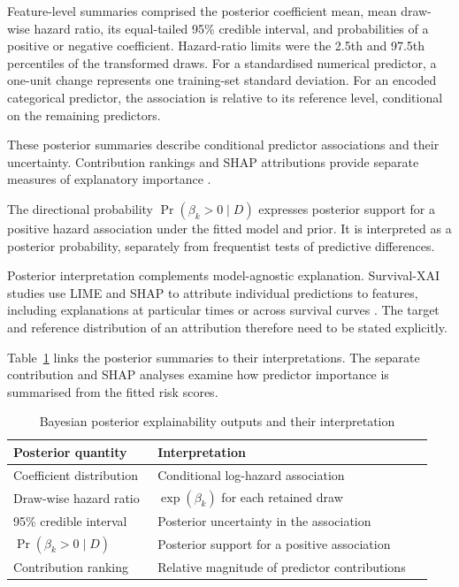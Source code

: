 Feature-level summaries comprised the posterior coefficient mean, mean draw-wise hazard ratio, its equal-tailed 95\% credible interval, and probabilities of a positive or negative coefficient. Hazard-ratio limits were the 2.5th and 97.5th percentiles of the transformed draws. For a standardised numerical predictor, a one-unit change represents one training-set standard deviation. For an encoded categorical predictor, the association is relative to its reference level, conditional on the remaining predictors.



These posterior summaries describe conditional predictor associations and their uncertainty. Contribution rankings and SHAP attributions provide separate measures of explanatory importance \cite{ref40,ref53}.

The directional probability $\Pr(\beta_k>0\mid D)$ expresses posterior support for a positive hazard association under the fitted model and prior. It is interpreted as a posterior probability, separately from frequentist tests of predictive differences.

Posterior interpretation complements model-agnostic explanation. Survival-XAI studies use LIME and SHAP to attribute individual predictions to features, including explanations at particular times or across survival curves \cite{ref28,ref30,ref60}. The target and reference distribution of an attribution therefore need to be stated explicitly.

Table~\ref{_Toc245465019} links the posterior summaries to their interpretations. The separate contribution and SHAP analyses examine how predictor importance is summarised from the fitted risk scores.

\begin{table}[htbp]
\centering
\caption{Bayesian posterior explainability outputs and their interpretation}
\label{_Toc245465019}
\begin{tabular}{@{}p{0.33\linewidth}p{0.63\linewidth}@{}}
\toprule
Posterior quantity & Interpretation\\
\midrule
Coefficient distribution & Conditional log-hazard association\\
Draw-wise hazard ratio & $\exp(\beta_k)$ for each retained draw\\
95\% credible interval & Posterior uncertainty in the association\\
$\Pr(\beta_k>0\mid D)$ & Posterior support for a positive association\\
Contribution ranking & Relative magnitude of predictor contributions\\
\bottomrule
\end{tabular}
\end{table}

